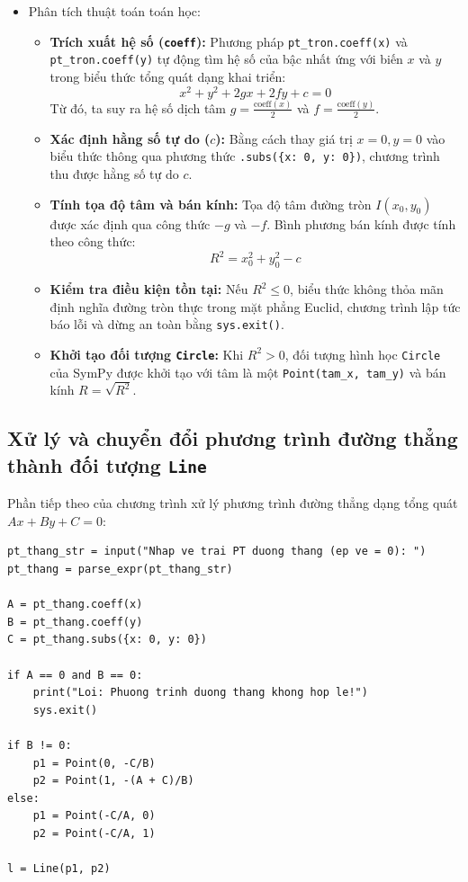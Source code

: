 \documentclass[12pt,a4paper]{article}
\begin{document}
\begin{itemize}
    \item Phân tích thuật toán toán học:
    \begin{itemize}
        \item \textbf{Trích xuất hệ số (\texttt{coeff}):} Phương pháp \texttt{pt\_tron.coeff(x)} và \texttt{pt\_tron.coeff(y)} tự động tìm hệ số của bậc nhất ứng với biến $x$ và $y$ trong biểu thức tổng quát dạng khai triển:
        $$x^2 + y^2 + 2gx + 2fy + c = 0$$
        Từ đó, ta suy ra hệ số dịch tâm $g = \frac{\text{coeff}(x)}{2}$ và $f = \frac{\text{coeff}(y)}{2}$.
        \item \textbf{Xác định hằng số tự do ($c$):} Bằng cách thay giá trị $x = 0, y = 0$ vào biểu thức thông qua phương thức \texttt{.subs(\{x: 0, y: 0\})}, chương trình thu được hằng số tự do $c$.
        \item \textbf{Tính tọa độ tâm và bán kính:} Tọa độ tâm đường tròn $I(x_0, y_0)$ được xác định qua công thức $-g$ và $-f$. Bình phương bán kính được tính theo công thức:
        $$R^2 = x_0^2 + y_0^2 - c$$
        \item \textbf{Kiểm tra điều kiện tồn tại:} Nếu $R^2 \le 0$, biểu thức không thỏa mãn định nghĩa đường tròn thực trong mặt phẳng Euclid, chương trình lập tức báo lỗi và dừng an toàn bằng \texttt{sys.exit()}.
        \item \textbf{Khởi tạo đối tượng \texttt{Circle}:} Khi $R^2 > 0$, đối tượng hình học \texttt{Circle} của SymPy được khởi tạo với tâm là một \texttt{Point(tam\_x, tam\_y)} và bán kính $R = \sqrt{R^2}$.
    \end{itemize}
\end{itemize}

\subsection{Xử lý và chuyển đổi phương trình đường thẳng thành đối tượng \texttt{Line}}

Phần tiếp theo của chương trình xử lý phương trình đường thẳng dạng tổng quát $Ax + By + C = 0$:

\begin{lstlisting}
pt_thang_str = input("Nhap ve trai PT duong thang (ep ve = 0): ")
pt_thang = parse_expr(pt_thang_str)

A = pt_thang.coeff(x)
B = pt_thang.coeff(y)
C = pt_thang.subs({x: 0, y: 0})

if A == 0 and B == 0:
    print("Loi: Phuong trinh duong thang khong hop le!")
    sys.exit()

if B != 0:
    p1 = Point(0, -C/B)
    p2 = Point(1, -(A + C)/B)
else:
    p1 = Point(-C/A, 0)
    p2 = Point(-C/A, 1)

l = Line(p1, p2)
\end{lstlisting}
\end{document}
